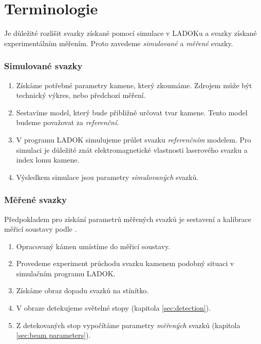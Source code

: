\part{Terminologie}

Je důležité rozlišit svazky získané pomocí simulace v LADOKu a svazky získané experimentálním měřením.   
Proto zavedeme \textit{simulované} a \textit{měřené} svazky.

\section{Simulované svazky}
\begin{enumerate}

\item 	Získáme potřebné parametry kamene, který zkoumáme. Zdrojem může být technický výkres, nebo předchozí měření.  

\item	Sestavíme model, který bude přibližně určovat tvar kamene. Tento model budeme považovat za \textit{referenční}.

\item	V programu LADOK simulujeme průlet svazku \textit{referenčním} modelem. Pro simulaci je důležité znát elektromagnetické vlastnosti laserového svazku a index lomu kamene. 

\item	Výsledkem simulace jsou parametry \textit{simulovaných} svazků.

\end{enumerate}

\section{Měřené svazky}
Předpokladem pro získání parametrů měřených svazků je sestavení a kalibrace měřicí soustavy podle \cite{Drapela}. %
\begin{enumerate}

\item 	Opracovaný kámen umístíme do měřicí soustavy.

\item	Provedeme experiment průchodu svazku kamenem podobný situaci v simulačním programu LADOK. 

\item	Získáme obraz dopadu svazků na stínítko. 

\item	V obraze detekujeme světelné stopy (kapitola \ref{sec:detection}).  

\item	Z detekovaných stop vypočítáme parametry \textit{měřených} svazků (kapitola \ref{sec:beam parameters}).

\end{enumerate}

